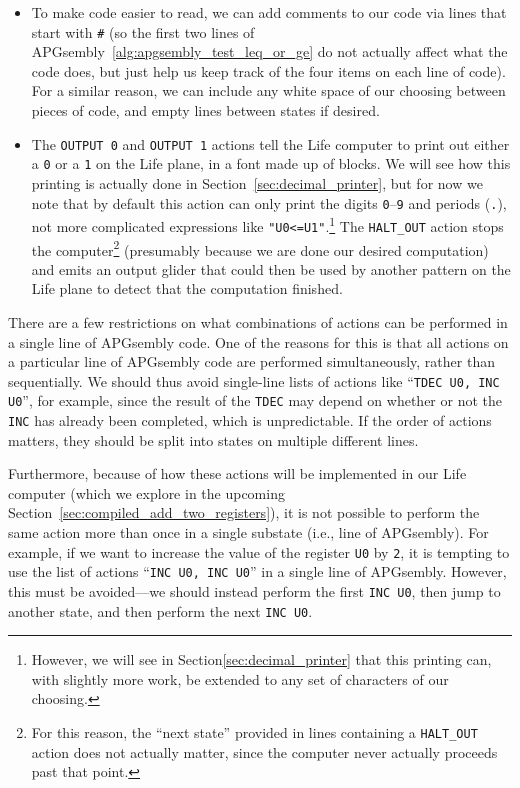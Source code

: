 \begin{itemize}
	\item To make code easier to read, we can add comments to our code via lines that start with \texttt{\#} (so the first two lines of APGsembly~\ref{alg:apgsembly_test_leq_or_ge} do not actually affect what the code does, but just help us keep track of the four items on each line of code). For a similar reason, we can include any white space of our choosing between pieces of code, and empty lines between states if desired.\smallskip
	
	\item The \texttt{OUTPUT 0} and \texttt{OUTPUT 1} actions tell the Life computer to print out either a \texttt{0} or a \texttt{1} on the Life plane, in a font made up of blocks. We will see how this printing is actually done in Section~\ref{sec:decimal_printer}, but for now we note that by default this action can only print the digits \texttt{0}--\texttt{9} and periods (\texttt{.}), not more complicated expressions like \texttt{"U0<=U1"}.\footnote{However, we will see in Section\ref{sec:decimal_printer} that this printing can, with slightly more work, be extended to any set of characters of our choosing.} The \texttt{HALT\_OUT} action stops the computer\footnote{For this reason, the ``next state'' provided in lines containing a \texttt{HALT\_OUT} action does not actually matter, since the computer never actually proceeds past that point.} (presumably because we are done our desired computation) and emits an output glider that could then be used by another pattern on the Life plane to detect that the computation finished.\smallskip
\end{itemize}

There are a few restrictions on what combinations of actions can be performed in a single line of APGsembly code. One of the reasons for this is that all actions on a particular line of APGsembly code are performed simultaneously, rather than sequentially. We should thus avoid single-line lists of actions like ``\texttt{TDEC U0, INC U0}'', for example, since the result of the \texttt{TDEC} may depend on whether or not the \texttt{INC} has already been completed, which is unpredictable. If the order of actions matters, they should be split into states on multiple different lines.

Furthermore, because of how these actions will be implemented in our Life computer (which we explore in the upcoming Section~\ref{sec:compiled_add_two_registers}), it is not possible to perform the same action more than once in a single substate (i.e., line of APGsembly). For example, if we want to increase the value of the register \texttt{U0} by \texttt{2}, it is tempting to use the list of actions ``\texttt{INC U0, INC U0}'' in a single line of APGsembly. However, this must be avoided---we should instead perform the first \texttt{INC U0}, then jump to another state, and then perform the next \texttt{INC U0}.

